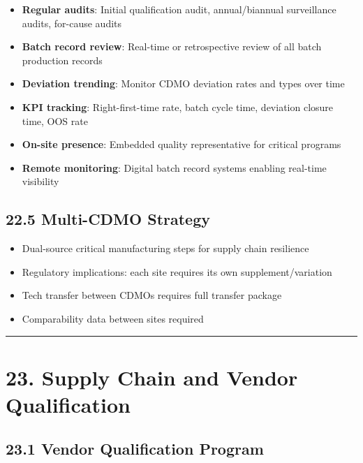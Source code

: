 \documentclass[
  11pt,
  a4paper,
]{report}
\providecommand{\tightlist}{%
  \setlength{\itemsep}{0pt}\setlength{\parskip}{0pt}}
\begin{document}
\begin{itemize}
\tightlist
\item
  \textbf{Regular audits}: Initial qualification audit, annual/biannual
  surveillance audits, for-cause audits
\item
  \textbf{Batch record review}: Real-time or retrospective review of all
  batch production records
\item
  \textbf{Deviation trending}: Monitor CDMO deviation rates and types
  over time
\item
  \textbf{KPI tracking}: Right-first-time rate, batch cycle time,
  deviation closure time, OOS rate
\item
  \textbf{On-site presence}: Embedded quality representative for
  critical programs
\item
  \textbf{Remote monitoring}: Digital batch record systems enabling
  real-time visibility
\end{itemize}

\hypertarget{multi-cdmo-strategy}{%
\subsection{22.5 Multi-CDMO Strategy}\label{multi-cdmo-strategy}}

\begin{itemize}
\tightlist
\item
  Dual-source critical manufacturing steps for supply chain resilience
\item
  Regulatory implications: each site requires its own
  supplement/variation
\item
  Tech transfer between CDMOs requires full transfer package
\item
  Comparability data between sites required
\end{itemize}

\begin{center}\rule{0.5\linewidth}{0.5pt}\end{center}

\hypertarget{supply-chain-and-vendor-qualification}{%
\section{23. Supply Chain and Vendor
Qualification}\label{supply-chain-and-vendor-qualification}}

\hypertarget{vendor-qualification-program}{%
\subsection{23.1 Vendor Qualification
Program}\label{vendor-qualification-program}}
\end{document}
